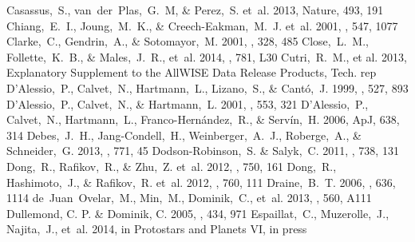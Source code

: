 \documentclass[apj]{emulateapj-rtx4}
\begin{document}
\begin{thebibliography}{}
   Casassus,~S., van~der~Plas,~G.~M, \& Perez,~S. et~al. 2013, Nature, 493, 191
   Chiang,~E.~I., Joung,~M.~K., \& Creech-Eakman,~M.~J. et~al. 2001, \apj, 547, 1077 
    Clarke,~C., Gendrin,~A., \& Sotomayor,~M. 2001, \mnras, 328, 485
   Close,~L.~M., Follette,~K.~B., \& Males,~J.~R., et~al. 2014, \apj, 781, L30
   Cutri,~R.~M., et al. 2013, Explanatory Supplement to the AllWISE Data Release Products, Tech. rep
   D'Alessio,~P., Calvet,~N., Hartmann,~L., Lizano,~S., \& Cant\'{o},~J. 1999, \apj, 527, 893
   D'Alessio,~P., Calvet,~N., \& Hartmann,~L. 2001, \apj, 553, 321 
   D'Alessio,~P., Calvet,~N., Hartmann,~L., Franco-Hern\'{a}ndez,~R., \& Serv\'{i}n,~H. 2006, ApJ, 638, 314 
   Debes,~J.~H., Jang-Condell,~H., Weinberger,~A.~J., Roberge,~A., \& Schneider,~G. 2013, \apj, 771, 45 
   Dodson-Robinson,~S. \& Salyk,~C. 2011, \apj, 738, 131 
   Dong,~R., Rafikov,~R., \& Zhu,~Z. et~al. 2012, \apj, 750, 161 
   Dong,~R., Hashimoto,~J., \& Rafikov,~R. et~al. 2012, \apj, 760, 111 
   Draine,~B.~T. 2006, \apj, 636, 1114 
   de~Juan~Ovelar,~M., Min,~M., Dominik,~C., et~al. 2013, \aap, 560, A111
   Dullemond, C. P. \& Dominik, C. 2005, \aap, 434, 971
   Espaillat,~C., Muzerolle,~J., Najita,~J., et~al. 2014, in Protostars and Planets VI, in press

\end{thebibliography}
\end{document}
